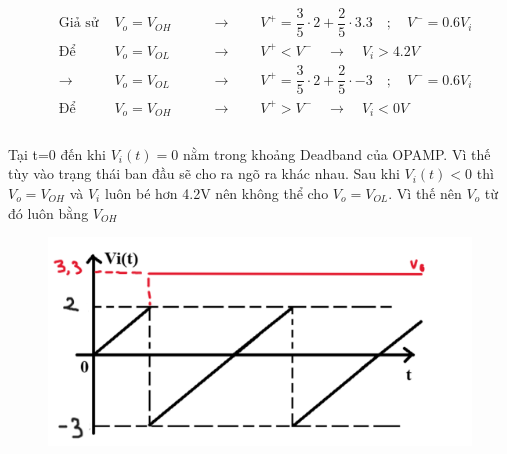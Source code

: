 \[
\begin{aligned}
&\text{Giả sử }& V_o = V_{OH} &\qquad\rightarrow\qquad V^+ = \dfrac{3}{5}\cdot2 + \dfrac{2}{5}\cdot3.3 \quad;\quad V^- = 0.6V_i \\
&\text{Để }& V_o = V_{OL} &\qquad\rightarrow\qquad V^+ < V^- \quad\rightarrow\quad \boxed{V_i>4.2V}\\
&\rightarrow& V_o = V_{OL} &\qquad\rightarrow\qquad V^+ = \dfrac{3}{5}\cdot2 + \dfrac{2}{5}\cdot-3 \quad;\quad V^- = 0.6V_i \\
&\text{Để }& V_o = V_{OH} &\qquad\rightarrow\qquad V^+ > V^- \quad\rightarrow\quad \boxed{V_i<0V}\\
\end{aligned}
\]\\
Tại t=0 đến khi $V_i(t)=0$ nằm trong khoảng Deadband của OPAMP. Vì thế tùy vào trạng thái ban đầu sẽ cho ra ngõ ra khác nhau.
Sau khi $V_i(t)<0$ thì $V_o = V_{OH}$ và $V_i$ luôn bé hơn 4.2V nên không thể cho $V_o=V_{OL}$. Vì thế nên $V_o$ từ đó luôn bằng $V_{OH}$
\begin{figure}[H]
	\centering
	\includegraphics[scale=1]{image/C13_a_BT.png}
\end{figure}


